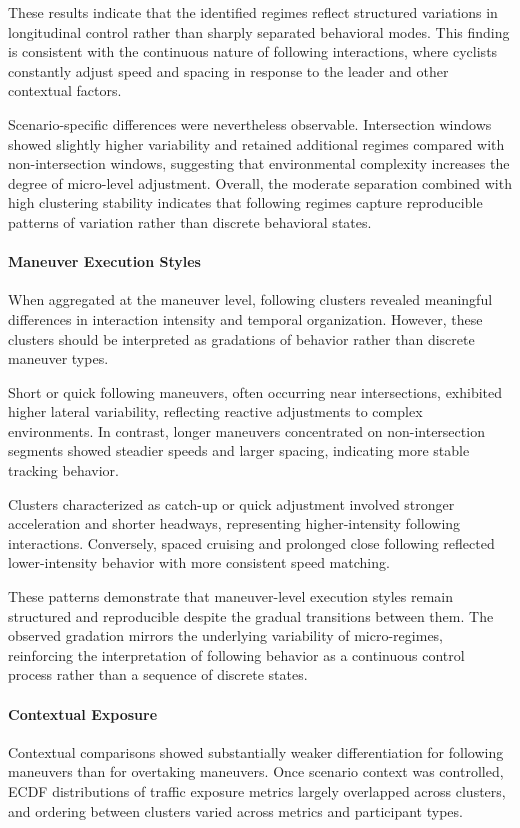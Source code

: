 These results indicate that the identified regimes reflect structured variations in longitudinal control rather than sharply separated behavioral modes. This finding is consistent with the continuous nature of following interactions, where cyclists constantly adjust speed and spacing in response to the leader and other contextual factors.

Scenario-specific differences were nevertheless observable. Intersection windows showed slightly higher variability and retained additional regimes compared with non-intersection windows, suggesting that environmental complexity increases the degree of micro-level adjustment. Overall, the moderate separation combined with high clustering stability indicates that following regimes capture reproducible patterns of variation rather than discrete behavioral states.

\paragraph{Maneuver Execution Styles}
When aggregated at the maneuver level, following clusters revealed meaningful differences in interaction intensity and temporal organization. However, these clusters should be interpreted as gradations of behavior rather than discrete maneuver types.

Short or quick following maneuvers, often occurring near intersections, exhibited higher lateral variability, reflecting reactive adjustments to complex environments. In contrast, longer maneuvers concentrated on non-intersection segments showed steadier speeds and larger spacing, indicating more stable tracking behavior.

Clusters characterized as catch-up or quick adjustment involved stronger acceleration and shorter headways, representing higher-intensity following interactions. Conversely, spaced cruising and prolonged close following reflected lower-intensity behavior with more consistent speed matching.

These patterns demonstrate that maneuver-level execution styles remain structured and reproducible despite the gradual transitions between them. The observed gradation mirrors the underlying variability of micro-regimes, reinforcing the interpretation of following behavior as a continuous control process rather than a sequence of discrete states.

\paragraph{Contextual Exposure}
Contextual comparisons showed substantially weaker differentiation for following maneuvers than for overtaking maneuvers. Once scenario context was controlled, ECDF distributions of traffic exposure metrics largely overlapped across clusters, and ordering between clusters varied across metrics and participant types.

